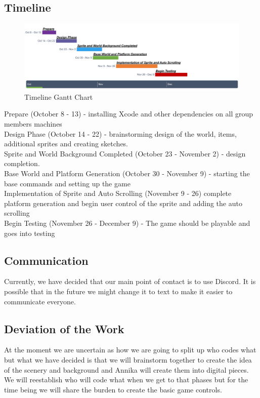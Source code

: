 \documentclass{article}
\begin{document}
\subsection{Timeline}
    \begin{figure}[H]
        \centering
        \includegraphics[width=1.25\columnwidth]{Project Outline.png}
        \caption{Timeline Gantt Chart}
    \end{figure}
\noindent Prepare (October 8 - 13) - installing Xcode and other dependencies on all group members machines
\\Design Phase (October 14 - 22) - brainstorming design of the world, items, additional sprites and creating sketches.
\\Sprite and World Background Completed (October 23 - November 2) - design completion.
\\Base World and Platform Generation (October 30 - November 9) - starting the base commands and setting up the game
\\Implementation of Sprite and Auto Scrolling (November 9 - 26) complete platform generation and begin user control of the sprite and adding the auto scrolling
\\ Begin Testing (November 26 - December 9) - The game should be playable and goes into testing
\subsection{Communication}
Currently, we have decided that our main point of contact is to use Discord. It is possible that in the future we might change it to text to make it easier to communicate everyone.
\subsection{Deviation of the Work}
At the moment we are uncertain as how we are going to split up who codes what but what we have decided is that we will brainstorm together to create the idea of the scenery and background and Annika will create them into digital pieces. We will reestablish who will code what when we get to that phases but for the time being we will share the burden to create the basic game controls.

\newpage



\end{document}
